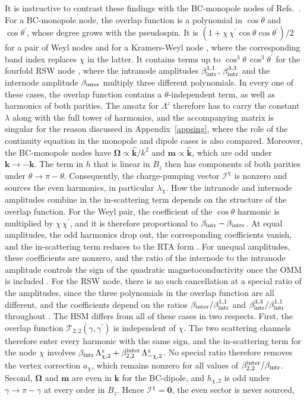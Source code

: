 \documentclass[aps,prb,onecolumn,nofootinbib,citeautoscript,10pt]{revtex4-2}
\newcommand{\bs}[1]{\boldsymbol{#1}}
\begin{document}
It is instructive to contrast these findings with the BC-monopole nodes of Refs.~\cite{timm, ips-exact-spin1, ips-exact-kwn, ips-exact-rsw}. For a BC-monopole node, the overlap function is a polynomial in $\cos\theta$ and $\cos\theta^\prime$, whose degree grows with the pseudospin. It is $\left(1+\chi\,\chi^\prime\cos\theta\cos\theta^\prime\right)/2$ for a pair of Weyl nodes \cite{timm} and for a Kramers-Weyl node \cite{ips-exact-kwn}, where the corresponding band index replaces $\chi$ in the latter. It contains terms up to $\cos^3\theta\,\cos^3\theta^\prime$ for the fourfold RSW node \cite{ips-exact-rsw}, where the intranode amplitudes $\beta^{1,1}_{\rm intr}$, $\beta^{3,3}_{\rm intr}$ and the internode amplitude $\beta_{\rm inter}$ multiply three different polynomials. In every one of these cases, the overlap function contains a $\theta$-independent term, as well as harmonics of both parities. The ansatz for $\Lambda^z$ therefore has to carry the constant $\lambda$ along with the full tower of harmonics, and the accompanying matrix is singular for the reason discussed in Appendix~\ref{appsing}, where the role of the continuity equation in the monopole and dipole cases is also compared. Moreover, the BC-monopole nodes have $\bs\Omega\propto\hat{\bs k}/k^2$ and $\bs m\propto\hat{\bs k}$, which are odd under $\bs k\to-\bs k$. The term in $h$ that is linear in $B_z$ then has components of both parities under $\theta\to\pi-\theta$. Consequently, the charge-pumping vector $\bs{\mathcal I}^\chi$ is nonzero and sources the even harmonics, in particular $\lambda_\chi$. How the intranode and internode amplitudes combine in the in-scattering term depends on the structure of the overlap function. For the Weyl pair, the coefficient of the $\cos\theta$ harmonic is multiplied by $\chi\,\chi^\prime$, and it is therefore proportional to $\beta_{\rm intr}-\beta_{\rm inter}$. At equal amplitudes, the odd harmonics drop out, the corresponding coefficients vanish, and the in-scattering term reduces to the RTA form \cite{timm}. For unequal amplitudes, these coefficients are nonzero, and the ratio of the internode to the intranode amplitude controls the sign of the quadratic magnetoconductivity once the OMM is included \cite{timm, ips-exact-spin1}. For the RSW node, there is no such cancellation at a special ratio of the amplitudes, since the three polynomials in the overlap function are all different, and the coefficients depend on the ratios $\beta_{\rm inter}/\beta^{1,1}_{\rm intr}$ and $\beta^{3,3}_{\rm intr}/\beta^{1,1}_{\rm intr}$ throughout \cite{ips-exact-rsw}. The HSM differs from all of these cases in two respects. First, the overlap function $\mathcal T_{2,2}(\gamma,\gamma^\prime)$ is independent of $\chi$. The two scattering channels therefore enter every harmonic with the same sign, and the in-scattering term for the node $\chi$ involves $\beta_{\rm intr}\,\Lambda^z_{\chi,2}+\beta^{\rm inter}_{2,2}\,\Lambda^z_{-\chi,2}$. No special ratio therefore removes the vertex correction $a_\chi$, which remains nonzero for all values of $\beta^{\rm inter}_{2,2}/\beta_{\rm intr}$. Second, $\bs\Omega$ and $\bs m$ are even in $\bs k$ for the BC-dipole, and $h_{\chi,2}$ is odd under $\gamma\to\pi-\gamma$ at every order in $B_z$. Hence $\bs{\mathcal I}^\chi=\bs0$, the even sector is never sourced, 
\end{document}
